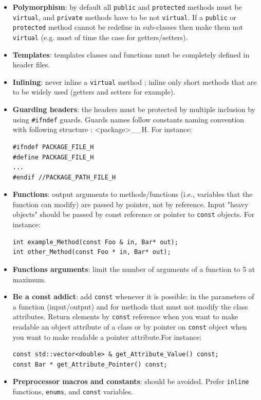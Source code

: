 \documentclass[12pt,a4paper]{article}
\begin{document}
\begin{itemize}
\item \textbf{Polymorphism}: by default all \texttt{public} and \texttt{protected} methods must be \texttt{virtual}, and \texttt{private} methods have to be not \texttt{virtual}. If a \texttt{public} or \texttt{protected} method cannot be redefine in sub-classes then make them not \texttt{virtual} (e.g. most of time the case for getters/setters).
\item \textbf{Templates}: templates classes and functions must be completely defined in header files.
\item \textbf{Inlining}: never inline a \texttt{virtual} method ; inline only short methods that are to be widely used (getters and setters for example).
\item \textbf{Guarding headers}: the headers must be protected by multiple inclusion by using \texttt{\#ifndef} guards. Guards names follow constants naming convention with following structure : <package>\_<file name>\_H. For instance:
\begin{verbatim}
#ifndef PACKAGE_FILE_H 
#define PACKAGE_FILE_H 
...
#endif //PACKAGE_PATH_FILE_H 
\end{verbatim}
\item \textbf{Functions}: output arguments to methods/functions (i.e., variables that the function can modify) are passed by pointer, not by reference. Input "heavy objects" should be passed by const reference or pointer to \texttt{const} objects. For instance:
\begin{verbatim}
int example_Method(const Foo & in, Bar* out); 
int other_Method(const Foo * in, Bar* out);
\end{verbatim}
\item \textbf{Functions arguments}: limit the number of arguments of a function to 5 at maximum.
\item  \textbf{Be a const addict}: add \texttt{const} whenever it is possible: in the parameters of a function (input/output) and for methods that must not modify the class attributes. Return elements by \texttt{const} reference when you want to make readable an object attribute of a class or by pointer on \texttt{const} object when you want to make readable a pointer attribute.For instance:
\begin{verbatim}
const std::vector<double> & get_Attribute_Value() const;
const Bar * get_Attribute_Pointer() const;
\end{verbatim}
\item \textbf{Preprocessor macros and constants}: should be avoided. Prefer \texttt{inline} functions, \texttt{enums}, and \texttt{const} variables.

\end{itemize}
\end{document}
